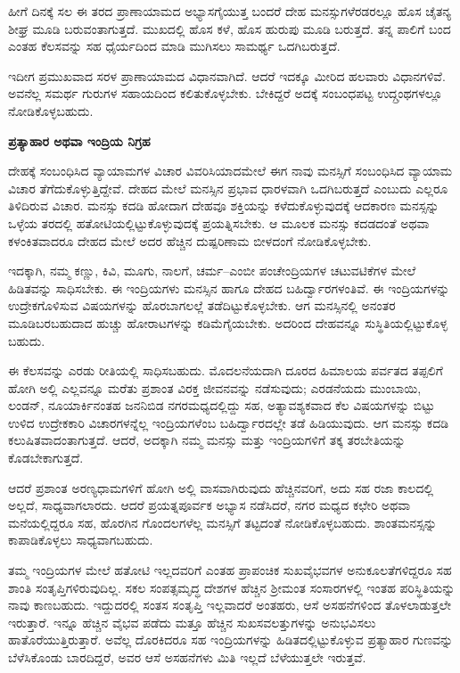 ಹೀಗೆ ದಿನಕ್ಕೆ  ಸಲ ಈ ತರದ ಪ್ರಾಣಾಯಾಮದ ಅಭ್ಯಾಸಗೈಯುತ್ತ ಬಂದರೆ ದೇಹ ಮನಸ್ಸುಗಳೆರಡರಲ್ಲೂ ಹೊಸ ಚೈತನ್ಯ ಶೀಘ್ರ ಮೂಡಿ ಬರುವಂತಾಗುತ್ತದೆ. ಮುಖದಲ್ಲಿ ಹೊಸ ಕಳೆ, ಹೊಸ ಹುರುಪು ಮೂಡಿ ಬರುತ್ತದೆ. ತನ್ನ ಪಾಲಿಗೆ ಬಂದ ಎಂತಹ ಕೆಲಸವನ್ನು ಸಹ ಧೈರ್ಯದಿಂದ ಮಾಡಿ ಮುಗಿಸಲು ಸಾಮರ್ಥ್ಯ ಒದಗಿಬರುತ್ತದೆ.

ಇದೀಗ ಪ್ರಮುಖವಾದ ಸರಳ ಪ್ರಾಣಾಯಾಮದ ವಿಧಾನವಾಗಿದೆ. ಆದರೆ ಇದಕ್ಕೂ ಮೀರಿದ ಹಲವಾರು ವಿಧಾನಗಳಿವೆ. ಅವನೆಲ್ಲ ಸಮರ್ಥ ಗುರುಗಳ ಸಹಾಯದಿಂದ ಕಲಿತುಕೊಳ್ಳಬೇಕು. ಬೇಕಿದ್ದರೆ ಅದಕ್ಕೆ ಸಂಬಂಧಪಟ್ಟ ಉದ್ಗ್ರಂಥಗಳಲ್ಲೂ ನೋಡಿಕೊಳ್ಳಬಹುದು.

\textbf{ಪ್ರತ್ಯಾಹಾರ ಅಥವಾ ಇಂದ್ರಿಯ ನಿಗ್ರಹ}

ದೇಹಕ್ಕೆ ಸಂಬಂಧಿಸಿದ ವ್ಯಾಯಾಮಗಳ ವಿಚಾರ ವಿವರಿಸಿಯಾದಮೇಲೆ ಈಗ ನಾವು ಮನಸ್ಸಿಗೆ ಸಂಬಂಧಿಸಿದ ವ್ಯಾಯಾಮ ವಿಚಾರ ತೆಗೆದುಕೊಳ್ಳುತ್ತಿದ್ದೇವೆ. ದೇಹದ ಮೇಲೆ ಮನಸ್ಸಿನ ಪ್ರಭಾವ ಧಾರಳವಾಗಿ ಒದಗಿಬರುತ್ತದೆ ಎಂಬುದು ಎಲ್ಲರೂ ತಿಳಿದಿರುವ ವಿಚಾರ. ಮನಸ್ಸು ಕದಡಿ ಹೋದಾಗ ದೇಹವೂ ಶಕ್ತಿಯನ್ನು ಕಳೆದುಕೊಳ್ಳುವುದಕ್ಕೆ ಆದಕಾರಣ ಮನಸ್ಸನ್ನು ಒಳ್ಳೆಯ ತರದಲ್ಲಿ ಹತೋಟಿಯಲ್ಲಿಟ್ಟುಕೊಳ್ಳುವುದಕ್ಕೆ ಪ್ರಯತ್ನಿಸಬೇಕು. ಆ ಮೂಲಕ ಮನಸ್ಸು ಕದಡದಂತೆ ಅಥವಾ ಕಳಂಕಿತವಾದರೂ ದೇಹದ ಮೇಲೆ ಅದರ ಹೆಚ್ಚಿನ ದುಷ್ಪರಿಣಾಮ ಬೀಳದಂಗೆ ನೋಡಿಕೊಳ್ಳಬೇಕು.

ಇದಕ್ಕಾಗಿ, ನಮ್ಮ ಕಣ್ಣು, ಕಿವಿ, ಮೂಗು, ನಾಲಗೆ, ಚರ್ಮ–ಎಂಬೀ ಪಂಚೇಂದ್ರಿಯಗಳ ಚಟುವಟಿಕೆಗಳ ಮೇಲೆ ಹಿಡಿತವನ್ನು ಸಾಧಿಸಬೇಕು. ಈ ಇಂದ್ರಿಯಗಳು ಮನಸ್ಸಿನ ಹಾಗೂ ದೇಹದ ಬಹಿರ್ದ್ವಾರಗಳಂತಿವೆ. ಈ ಇಂದ್ರಿಯಗಳನ್ನು ಉದ್ರೇಕಗೊಳಿಸುವ ವಿಷಯಗಳನ್ನು ಹೊರಬಾಗಲಲ್ಲೆ ತಡೆದಿಟ್ಟುಕೊಳ್ಳಬೇಕು. ಆಗ ಮನಸ್ಸಿನಲ್ಲಿ ಅನಂತರ ಮೂಡಿಬರಬಹುದಾದ ಹುಚ್ಚು ಹೋರಾಟಗಳನ್ನು ಕಡಿಮೆಗೈಯಬೇಕು. ಅದರಿಂದ ದೇಹವನ್ನೂ ಸುಸ್ಥಿತಿಯಲ್ಲಿಟ್ಟುಕೊಳ್ಳ ಬಹುದು.

ಈ ಕೆಲಸವನ್ನು ಎರಡು ರೀತಿಯಲ್ಲಿ ಸಾಧಿಸಬಹುದು. ಮೊದಲನೆಯದಾಗಿ ದೂರದ ಹಿಮಾಲಯ ಪರ್ವತದ ತಪ್ಪಲಿಗೆ ಹೋಗಿ ಅಲ್ಲಿ ಎಲ್ಲವನ್ನೂ ಮರೆತು ಪ್ರಶಾಂತ ವಿರಕ್ತ ಜೀವನವನ್ನು ನಡೆಸುವುದು; ಎರಡನೆಯದು ಮುಂಬಾಯಿ, ಲಂಡನ್, ನೂಯಾರ್ಕಿನಂತಹ ಜನನಿಬಿಡ ನಗರಮಧ್ಯದಲ್ಲಿದ್ದು ಸಹ, ಅತ್ಯಾವಶ್ಯಕವಾದ ಕೆಲ ವಿಷಯಗಳನ್ನು ಬಿಟ್ಟು ಉಳಿದ ಉದ್ರೇಕಕಾರಿ ವಿಚಾರಗಳನ್ನೆಲ್ಲ ಇಂದ್ರಿಯಗಳೆಂಬ ಬಹಿರ್ದ್ವಾರದಲ್ಲೇ ತಡೆ ಹಿಡಿಯುವುದು. ಆಗ ಮನಸ್ಸು ಕದಡಿ ಕಲುಷಿತವಾದಂತಾಗುತ್ತದೆ. ಆದರೆ, ಅದಕ್ಕಾಗಿ ನಮ್ಮ ಮನಸ್ಸು ಮತ್ತು ಇಂದ್ರಿಯಗಳಿಗೆ ತಕ್ಕ ತರಬೇತಿಯನ್ನು ಕೊಡಬೇಕಾಗುತ್ತದೆ.

ಆದರೆ ಪ್ರಶಾಂತ ಅರಣ್ಯಧಾಮಗಳಿಗೆ ಹೋಗಿ ಅಲ್ಲಿ ವಾಸವಾಗಿರುವುದು ಹೆಚ್ಚಿನವರಿಗೆ, ಅದು ಸಹ ರಜಾ ಕಾಲದಲ್ಲಿ ಅಲ್ಲದೆ, ಸಾಧ್ಯವಾಗಲಾರದು. ಆದರೆ ಪ್ರಯತ್ನಪೂರ್ವಕ ಅಭ್ಯಾಸ ನಡೆಸಿದರೆ, ನಗರ ಮಧ್ಯದ ಕಛೇರಿ ಅಥವಾ ಮನೆಯಲ್ಲಿದ್ದರೂ ಸಹ, ಹೊರಗಿನ ಗೊಂದಲಗಳೆಲ್ಲ ಮನಸ್ಸಿಗೆ ತಟ್ಟದಂತೆ ನೋಡಿಕೊಳ್ಳಬಹುದು. ಶಾಂತಮನಸ್ಸನ್ನು ಕಾಪಾಡಿಕೊಳ್ಳಲು ಸಾಧ್ಯವಾಗಬಹುದು.

ತಮ್ಮ ಇಂದ್ರಿಯಗಳ ಮೇಲೆ ಹತೋಟಿ ಇಲ್ಲದವರಿಗೆ ಎಂತಹ ಪ್ರಾಪಂಚಿಕ ಸುಖವೈಭವಗಳ ಅನುಕೂಲತೆಗಳಿದ್ದರೂ ಸಹ ಶಾಂತಿ ಸಂತೃಪ್ತಿಗಳಿರುವುದಿಲ್ಲ. ಸಕಲ ಸಂಪತ್ಸಮೃದ್ಧ ದೇಶಗಳ ಹೆಚ್ಚಿನ ಶ‍್ರೀಮಂತ ಸಂಸಾರಗಳಲ್ಲಿ ಇಂತಹ ಪರಿಸ್ಥಿತಿಯನ್ನು ನಾವು ಕಾಣಬಹುದು. ಇದ್ದುದರಲ್ಲಿ ಸಂತಸ ಸಂತೃಪ್ತಿ ಇಲ್ಲವಾದರೆ ಅಂತಹರು, ಆಸೆ ಅಸಹನೆಗಳಿಂದ ತೊಳಲಾಡುತ್ತಲೇ ಇರುತ್ತಾರೆ. ಇನ್ನೂ ಹೆಚ್ಚಿನ ವೈಭವ ಪಡೆದು ಮತ್ತೂ ಹೆಚ್ಚಿನ ಸುಖಸವಲತ್ತುಗಳನ್ನು ಅನುಭವಿಸಲು ಹಾತೊರೆಯುತ್ತಿರುತ್ತಾರೆ. ಅವೆಲ್ಲ ದೊರಕಿದರೂ ಸಹ ಇಂದ್ರಿಯಗಳನ್ನು ಹಿಡಿತದಲ್ಲಿಟ್ಟುಕೊಳ್ಳುವ ಪ್ರತ್ಯಾಹಾರ ಗುಣವನ್ನು ಬೆಳೆಸಿಕೊಂಡು ಬಾರದಿದ್ದರೆ, ಅವರ ಆಸೆ ಅಸಹನೆಗಳು ಮಿತಿ ಇಲ್ಲದೆ ಬೆಳೆಯುತ್ತಲೇ ಇರುತ್ತವೆ.

